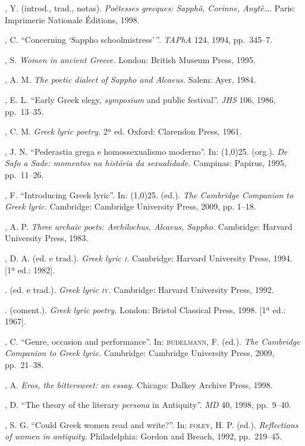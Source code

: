 \pagebreak
\begin{bibliohedra}
, Y. (introd., trad., notas). \textit{Poétesses grecques:
Sapphô, Corinne, Anytè\ldots{}}. Paris: Imprimerie Nationale Éditions, 1998.

, C. “Concerning ‘Sappho schoolmistress’\,”. \textit{TAPhA} 124,
1994, pp.~345--7.

, S. \textit{Women in ancient Greece.} London: British Museum
Press, 1995.

, A. M. \textit{The poetic dialect of Sappho and Alcaeus.} Salem:
Ayer, 1984. 

, E. L. “Early Greek elegy, \textit{symposium} and public festival”.
\textit{JHS} 106, 1986, pp.~13--35.

, C. M. \textit{Greek lyric poetry.} 2ª
ed. Oxford: Clarendon Press, 1961.

, J. N. “Pederastia grega e homossexualismo moderno”. In:
\line(1,0){25}. (org.). \textit{De Safo a Sade: momentos na história da
sexualidade.} Campinas: Papirus, 1995, pp.~11--26.

, F. “Introducing Greek lyric”. In:
\line(1,0){25}. (ed.). \textit{The Cambridge
Companion to Greek lyric.} Cambridge: Cambridge University Press, 2009, pp.
1--18.

, A. P. \textit{Three archaic poets: Archilochus, Alcaeus,
Sappho.} Cambridge: Harvard University Press, 1983. 

, D. A. (ed. e trad.). \textit{Greek lyric \textsc{i}.} Cambridge:
Harvard University Press, 1994. [1ª ed.: 1982].

\titidem. (ed. e trad.). \textit{Greek lyric \textsc{iv}.} Cambridge: Harvard
University Press, 1992.

\titidem. (coment.). \textit{Greek lyric poetry.} London: Bristol
Classical Press, 1998. [1ª ed.: 1967]. 

, C. “Genre, occasion and performance”. In:
\textsc{budelmann}, F. (ed.). \textit{The Cambridge Companion to Greek
lyric.} Cambridge: Cambridge University Press, 2009, pp.~21--38.

, A. \textit{Eros, the bittersweet: an essay.} Chicago:
Dalkey Archive Press, 1998.

, D. “The theory of the literary \textit{persona} in Antiquity”.
\textit{MD} 40, 1998, pp.~9--40.

, S. G. “Could Greek women read and write?”. In: \textsc{foley}, H.
P. (ed.). \textit{Reflections of women in antiquity.} Philadelphia: Gordon and
Breach, 1992, pp.~219--45.


\end{bibliohedra}
